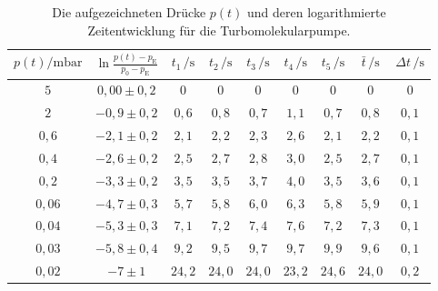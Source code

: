 \begin{table}
	\begin{center}
		\begin{tabular}{cc|ccccc|cc}
			\toprule
			{$p(t)/\mathrm{mbar}$} & {$\ln\frac{p(t)-p_\text{E}}{p_0-p_\text{E}}$} & {$t_1\,/\mathrm{s}$} & {$t_2\,/\mathrm{s}$} & {$t_3\,/\mathrm{s}$} & {$t_4\,/\mathrm{s}$} & {$t_5\,/\mathrm{s}$} & {$\bar{t}\,/\mathrm{s}$} & {$\Delta t\,/\mathrm{s}$} \\ \midrule
			$5$           &                 $0,00\pm0,2$                  &         $0$          &         $0$          &         $0$          &         $0$          &         $0$          &           $0$            &            $0$            \\
			$2$           &                 $-0,9\pm0,2$                  &        $0,6$         &        $0,8$         &        $0,7$         &        $1,1$         &        $0,7$         &          $0,8$           &           $0,1$           \\
			$0,6$          &                 $-2,1\pm0,2$                  &        $2,1$         &        $2,2$         &        $2,3$         &        $2,6$         &        $2,1$         &          $2,2$           &           $0,1$           \\
			$0,4$          &                 $-2,6\pm0,2$                  &        $2,5$         &        $2,7$         &        $2,8$         &        $3,0$         &        $2,5$         &          $2,7$           &           $0,1$           \\
			$0,2$          &                 $-3,3\pm0,2$                  &        $3,5$         &        $3,5$         &        $3,7$         &        $4,0$         &        $3,5$         &          $3,6$           &           $0,1$           \\
			$0,06$         &                 $-4,7\pm0,3$                  &        $5,7$         &        $5,8$         &        $6,0$         &        $6,3$         &        $5,8$         &          $5,9$           &           $0,1$           \\
			$0,04$         &                 $-5,3\pm0,3$                  &        $7,1$         &        $7,2$         &        $7,4$         &        $7,6$         &        $7,2$         &          $7,3$           &           $0,1$           \\
			$0,03$         &                 $-5,8\pm0,4$                  &        $9,2$         &        $9,5$         &        $9,7$         &        $9,7$         &        $9,9$         &          $9,6$           &           $0,1$           \\
			$0,02$         &                   $-7\pm1$                    &        $24,2$        &        $24,0$        &        $24,0$        &        $23,2$        &        $24,6$        &          $24,0$          &           $0,2$           \\ \bottomrule
		\end{tabular}
		\caption{Die aufgezeichneten Drücke $p(t)$ und deren logarithmierte Zeitentwicklung für die Turbomolekularpumpe.}
		\label{tab:tab7}
	\end{center}
\end{table}

